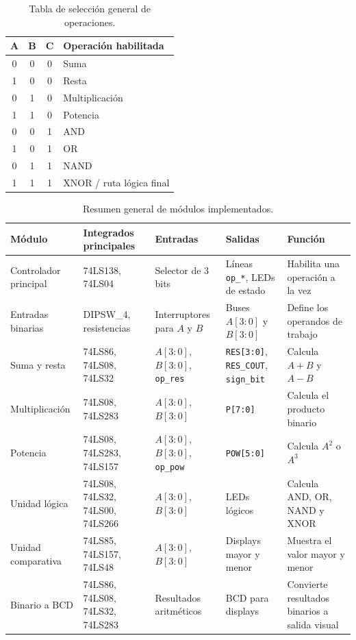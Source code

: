 \documentclass[12pt,a4paper]{article}
\begin{document}
\begin{table}[H]
    \centering
    \caption{Tabla de selección general de operaciones.}
    \begin{tabular}{c c c p{8cm}}
        \toprule
        \textbf{A} & \textbf{B} & \textbf{C} & \textbf{Operación habilitada} \\
        \midrule
        0 & 0 & 0 & Suma \\
        1 & 0 & 0 & Resta \\
        0 & 1 & 0 & Multiplicación \\
        1 & 1 & 0 & Potencia \\
        0 & 0 & 1 & AND \\
        1 & 0 & 1 & OR \\
        0 & 1 & 1 & NAND \\
        1 & 1 & 1 & XNOR / ruta lógica final \\
        \bottomrule
    \end{tabular}
\end{table}

\begin{table}[H]
    \centering
    \caption{Resumen general de módulos implementados.}
    \small
    \begin{tabular}{p{2.8cm}p{3.1cm}p{3cm}p{3cm}p{2.9cm}}
        \toprule
        \textbf{Módulo} & \textbf{Integrados principales} & \textbf{Entradas} & \textbf{Salidas} & \textbf{Función} \\
        \midrule
        Controlador principal & 74LS138, 74LS04 & Selector de 3 bits & Líneas \texttt{op\_*}, LEDs de estado & Habilita una operación a la vez \\
        Entradas binarias & DIPSW\_4, resistencias & Interruptores para $A$ y $B$ & Buses $A[3:0]$ y $B[3:0]$ & Define los operandos de trabajo \\
        Suma y resta & 74LS86, 74LS08, 74LS32 & $A[3:0]$, $B[3:0]$, \texttt{op\_res} & \texttt{RES[3:0]}, \texttt{RES\_COUT}, \texttt{sign\_bit} & Calcula $A+B$ y $A-B$ \\
        Multiplicación & 74LS08, 74LS283 & $A[3:0]$, $B[3:0]$ & \texttt{P[7:0]} & Calcula el producto binario \\
        Potencia & 74LS08, 74LS283, 74LS157 & $A[3:0]$, $B[3:0]$, \texttt{op\_pow} & \texttt{POW[5:0]} & Calcula $A^2$ o $A^3$ \\
        Unidad lógica & 74LS08, 74LS32, 74LS00, 74LS266 & $A[3:0]$, $B[3:0]$ & LEDs lógicos & Calcula AND, OR, NAND y XNOR \\
        Unidad comparativa & 74LS85, 74LS157, 74LS48 & $A[3:0]$, $B[3:0]$ & Displays mayor y menor & Muestra el valor mayor y menor \\
        Binario a BCD & 74LS86, 74LS08, 74LS32, 74LS283 & Resultados aritméticos & BCD para displays & Convierte resultados binarios a salida visual \\
        \bottomrule
    \end{tabular}
\end{table}
\end{document}
